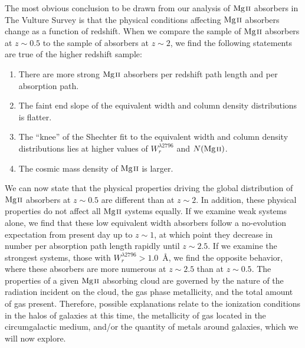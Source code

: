 \documentclass[iop,apj,numberedappendix,appendixfloats,twocolappendix]{emulateapj}
\begin{document}
The most obvious conclusion to be drawn from our analysis of ${\hbox{{\rm Mg}\kern 0.1em{\sc ii}}}$ absorbers in The Vulture Survey is that the physical conditions affecting ${\hbox{{\rm Mg}\kern 0.1em{\sc ii}}}$ absorbers change as a function of redshift. When we compare the sample of ${\hbox{{\rm Mg}\kern 0.1em{\sc ii}}}$ absorbers at $z \sim 0.5$ to the sample of absorbers at $z \sim 2$, we find the following statements are true of the higher redshift sample:

\begin{enumerate}
\item There are more strong ${\hbox{{\rm Mg}\kern 0.1em{\sc ii}}}$ absorbers per redshift path length and per absorption path.
\item The faint end slope of the equivalent width and column density distributions is flatter.
\item The ``knee'' of the Shechter fit to the equivalent width and column density distributions lies at higher values of $W_r^{\lambda2796}$ and $N(\hbox{{\rm Mg}\kern 0.1em{\sc ii}})$.
\item The cosmic mass density of ${\hbox{{\rm Mg}\kern 0.1em{\sc ii}}}$ is larger.
\end{enumerate}

\noindent We can now state that the physical properties driving the global distribution of ${\hbox{{\rm Mg}\kern 0.1em{\sc ii}}}$ absorbers at $z \sim 0.5$ are different than at $z \sim 2$. In addition, these physical properties do not affect all ${\hbox{{\rm Mg}\kern 0.1em{\sc ii}}}$ systems equally. If we examine weak systems alone, we find that these low equivalent width absorbers follow a no-evolution expectation from present day up to $z \sim 1$, at which point they decrease in number per absorption path length rapidly until $z \sim 2.5$. If we examine the strongest systems, those with $W_r^{\lambda2796} > 1.0$~{\AA}, we find the opposite behavior, where these absorbers are more numerous at $z \sim 2.5$ than at $z \sim 0.5$. The properties of a given ${\hbox{{\rm Mg}\kern 0.1em{\sc ii}}}$ absorbing cloud are governed by the nature of the radiation incident on the cloud, the gas phase metallicity, and the total amount of gas present. Therefore, possible explanations relate to the ionization conditions in the halos of galaxies at this time, the metallicity of gas located in the circumgalactic medium, and/or the quantity of metals around galaxies, which we will now explore.

\end{document}
